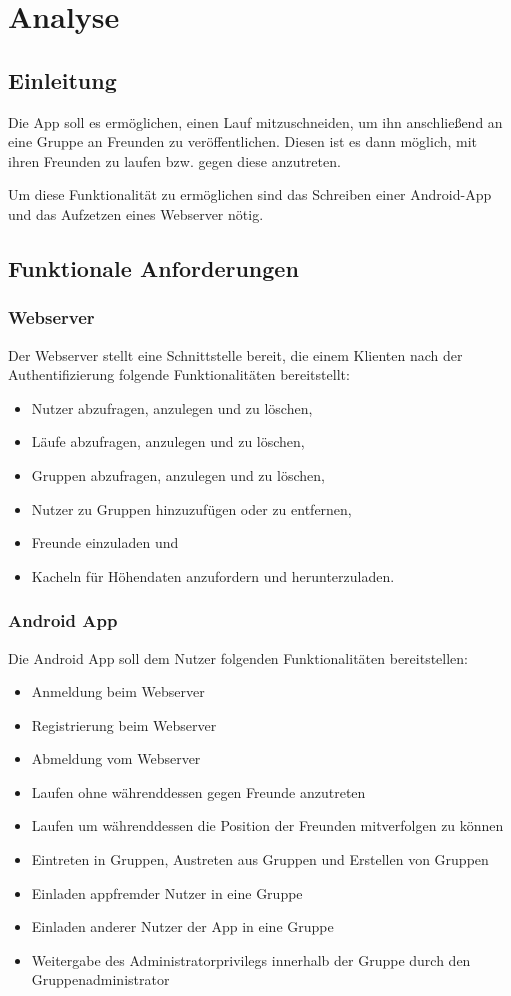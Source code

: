 \section{Analyse}\label{kapitel4}
\subsection{Einleitung}
Die App soll es ermöglichen, einen Lauf mitzuschneiden, um ihn anschließend an eine Gruppe an Freunden zu veröffentlichen. Diesen ist es dann möglich, mit ihren Freunden zu laufen bzw. gegen diese anzutreten. 

Um diese Funktionalität zu ermöglichen sind das Schreiben einer Android-App und das Aufzetzen eines Webserver nötig.
\subsection{Funktionale Anforderungen}
\subsubsection{Webserver}
Der Webserver stellt eine Schnittstelle bereit, die einem Klienten nach der Authentifizierung folgende Funktionalitäten bereitstellt:
\begin{itemize}
\item Nutzer abzufragen, anzulegen und zu löschen,
\item Läufe abzufragen, anzulegen und zu löschen,
\item Gruppen abzufragen, anzulegen und zu löschen,
\item Nutzer zu Gruppen hinzuzufügen oder zu entfernen,
\item Freunde einzuladen und
\item Kacheln für Höhendaten anzufordern und herunterzuladen.
\end{itemize}
\subsubsection{Android App}
Die Android App soll dem Nutzer folgenden Funktionalitäten bereitstellen:
\begin{itemize}
\item Anmeldung beim Webserver
\item Registrierung beim Webserver
\item Abmeldung vom Webserver
\item Laufen ohne währenddessen gegen Freunde anzutreten
\item Laufen um währenddessen die Position der Freunden mitverfolgen zu können
\item Eintreten in Gruppen, Austreten aus Gruppen und Erstellen von Gruppen
\item Einladen appfremder Nutzer in eine Gruppe
\item Einladen anderer Nutzer der App in eine Gruppe
\item Weitergabe des Administratorprivilegs innerhalb der Gruppe durch den Gruppenadministrator
\end{itemize}
